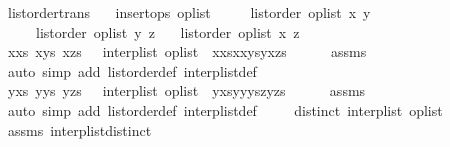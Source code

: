 \begin{isabellebody}
\endisatagproof
{\isafoldproof}%
%
\isadelimproof
\isanewline
%
\endisadelimproof
\isanewline
{}\isamarkupfalse%
\ list{\isacharunderscore}order{\isacharunderscore}trans{\isacharcolon}\isanewline
\ \ \ {\isachardoublequoteopen}insert{\isacharunderscore}ops\ op{\isacharunderscore}list{\isachardoublequoteclose}\isanewline
\ \ \ \ \ {\isachardoublequoteopen}list{\isacharunderscore}order\ op{\isacharunderscore}list\ x\ y{\isachardoublequoteclose}\isanewline
\ \ \ \ \ {\isachardoublequoteopen}list{\isacharunderscore}order\ op{\isacharunderscore}list\ y\ z{\isachardoublequoteclose}\isanewline
\ \ \ {\isachardoublequoteopen}list{\isacharunderscore}order\ op{\isacharunderscore}list\ x\ z{\isachardoublequoteclose}\isanewline
%
\isadelimproof
%
\endisadelimproof
%
\isatagproof
{}\isamarkupfalse%
\ {\isacharminus}\isanewline
\ \ \isamarkupfalse%
\ xxs\ xys\ xzs\ \ {}{\isacharcolon}\ {\isachardoublequoteopen}interp{\isacharunderscore}list\ op{\isacharunderscore}list\ {\isacharequal}\ {\isacharparenleft}xxs{\isacharat}{\isacharbrackleft}x{\isacharbrackright}{\isacharat}xys{\isacharparenright}{\isacharat}{\isacharparenleft}y{\isacharhash}xzs{\isacharparenright}{\isachardoublequoteclose}\isanewline
\ \ \ \ \isamarkupfalse%
\ assms\ \isamarkupfalse%
\ {\isacharparenleft}auto\ simp\ add{\isacharcolon}\ list{\isacharunderscore}order{\isacharunderscore}def\ interp{\isacharunderscore}list{\isacharunderscore}def{\isacharparenright}\isanewline
\ \ \isamarkupfalse%
\ yxs\ yys\ yzs\ \ {}{\isacharcolon}\ {\isachardoublequoteopen}interp{\isacharunderscore}list\ op{\isacharunderscore}list\ {\isacharequal}\ yxs{\isacharat}y{\isacharhash}{\isacharparenleft}yys{\isacharat}{\isacharbrackleft}z{\isacharbrackright}{\isacharat}yzs{\isacharparenright}{\isachardoublequoteclose}\isanewline
\ \ \ \ \isamarkupfalse%
\ assms\ \isamarkupfalse%
\ {\isacharparenleft}auto\ simp\ add{\isacharcolon}\ list{\isacharunderscore}order{\isacharunderscore}def\ interp{\isacharunderscore}list{\isacharunderscore}def{\isacharparenright}\isanewline
\ \ \isamarkupfalse%
\ {}{\isacharcolon}\ {\isachardoublequoteopen}distinct\ {\isacharparenleft}interp{\isacharunderscore}list\ op{\isacharunderscore}list{\isacharparenright}{\isachardoublequoteclose}\isanewline
\ \ \ \ \isamarkupfalse%
\ assms\ interp{\isacharunderscore}list{\isacharunderscore}distinct\ \isamarkupfalse%

\end{isabellebody}
